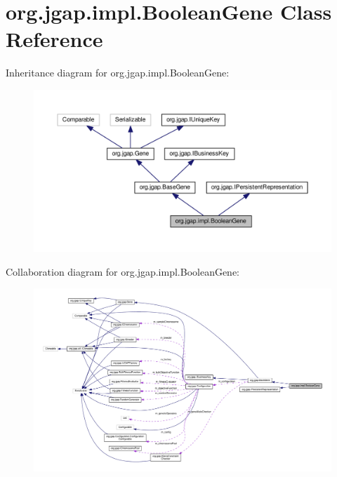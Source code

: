 \hypertarget{classorg_1_1jgap_1_1impl_1_1_boolean_gene}{\section{org.\-jgap.\-impl.\-Boolean\-Gene Class Reference}
\label{classorg_1_1jgap_1_1impl_1_1_boolean_gene}
}


Inheritance diagram for org.\-jgap.\-impl.\-Boolean\-Gene\-:
\nopagebreak
\begin{figure}[H]
\begin{center}
\leavevmode
\includegraphics[width=350pt]{classorg_1_1jgap_1_1impl_1_1_boolean_gene__inherit__graph}
\end{center}
\end{figure}


Collaboration diagram for org.\-jgap.\-impl.\-Boolean\-Gene\-:
\nopagebreak
\begin{figure}[H]
\begin{center}
\leavevmode
\includegraphics[width=350pt]{classorg_1_1jgap_1_1impl_1_1_boolean_gene__coll__graph}
\end{center}
\end{figure}
